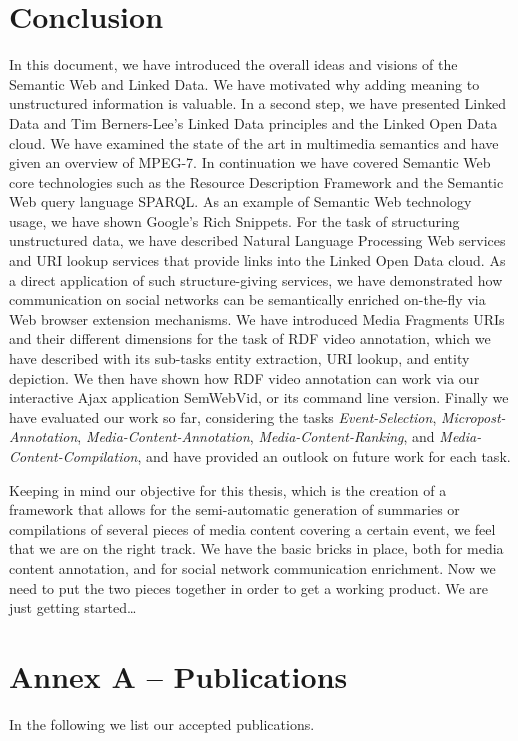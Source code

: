 \documentclass[12pt]{article}
\begin{document}
\section{Conclusion}
In this document, we have introduced the overall ideas and visions of the Semantic Web and Linked Data. We have motivated why adding meaning to unstructured information is valuable. In a second step, we have presented Linked Data and Tim Berners-Lee's Linked Data principles and the Linked Open Data cloud. We have examined the state of the art in multimedia semantics and have given an overview of MPEG-7. In continuation we have covered Semantic Web core technologies such as the Resource Description Framework and the Semantic Web query language SPARQL. As an example of Semantic Web technology usage, we have shown Google's Rich Snippets. For the task of structuring unstructured data, we have described Natural Language Processing Web services and URI lookup services that provide links into the Linked Open Data cloud. As a direct application of such structure-giving services, we have demonstrated how communication on social networks can be semantically enriched on-the-fly via Web browser extension mechanisms. We have introduced Media Fragments URIs and their different dimensions for the task of RDF video annotation, which we have described with its sub-tasks entity extraction, URI lookup, and entity depiction. We then have shown how RDF video annotation can work via our interactive Ajax application SemWebVid, or its command line version. Finally we have evaluated our work so far, considering the tasks \emph{Event-Selection}, \emph{Micropost-Annotation}, \emph{Media-Content-Annotation}, \emph{Media-Content-Ranking}, and \emph{Media-Content-Compilation}, and have provided an outlook on future work for each task.

Keeping in mind our objective for this thesis, which is the creation of a framework that allows for the semi-automatic generation of summaries or compilations of several pieces of media content covering a certain event, we feel that we are on the right track. We have the basic bricks in place, both for media content annotation, and for social network communication enrichment. Now we need to put the two pieces together in order to get a working product. We are just getting started\ldots

\pagebreak
\section{Annex A -- Publications}
In the following we list our accepted publications.
\end{document}
